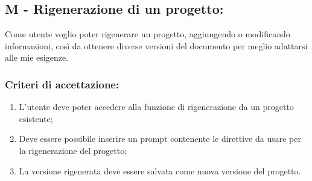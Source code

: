 \vspace{0.2cm}

\subsection*{M - Rigenerazione di un progetto:}

\noindent Come utente voglio poter rigenerare un progetto, aggiungendo o modificando informazioni, così da ottenere diverse versioni del documento per meglio adattarsi alle mie esigenze.

\subsubsection*{Criteri di accettazione:}

\begin{enumerate}
    \item L'utente deve poter accedere alla funzione di rigenerazione da un progetto esistente;
    \item Deve essere possibile inserire un \gls{prompt} contenente le direttive da usare per la rigenerazione del progetto;
    \item La versione rigenerata deve essere salvata come nuova versione del progetto.
\end{enumerate}



